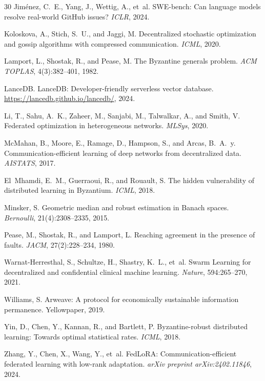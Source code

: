 \begin{thebibliography}{30}
Jim{\'e}nez, C.~E., Yang, J., Wettig, A., et~al.
\newblock SWE-bench: Can language models resolve real-world {GitHub} issues?
\newblock \emph{ICLR}, 2024.

Koloskova, A., Stich, S.~U., and Jaggi, M.
\newblock Decentralized stochastic optimization and gossip algorithms with
  compressed communication.
\newblock \emph{ICML}, 2020.

Lamport, L., Shostak, R., and Pease, M.
\newblock The Byzantine generals problem.
\newblock \emph{ACM TOPLAS}, 4(3):382--401, 1982.

LanceDB.
\newblock LanceDB: Developer-friendly serverless vector database.
\newblock \url{https://lancedb.github.io/lancedb/}, 2024.

Li, T., Sahu, A.~K., Zaheer, M., Sanjabi, M., Talwalkar, A., and Smith, V.
\newblock Federated optimization in heterogeneous networks.
\newblock \emph{MLSys}, 2020.

McMahan, B., Moore, E., Ramage, D., Hampson, S., and Arcas, B.~A.~y.
\newblock Communication-efficient learning of deep networks from decentralized
  data.
\newblock \emph{AISTATS}, 2017.

El~Mhamdi, E.~M., Guerraoui, R., and Rouault, S.
\newblock The hidden vulnerability of distributed learning in {B}yzantium.
\newblock \emph{ICML}, 2018.

Minsker, S.
\newblock Geometric median and robust estimation in {Banach} spaces.
\newblock \emph{Bernoulli}, 21(4):2308--2335, 2015.

Pease, M., Shostak, R., and Lamport, L.
\newblock Reaching agreement in the presence of faults.
\newblock \emph{JACM}, 27(2):228--234, 1980.

Warnat-Herresthal, S., Schultze, H., Shastry, K.~L., et~al.
\newblock Swarm Learning for decentralized and confidential clinical machine
  learning.
\newblock \emph{Nature}, 594:265--270, 2021.

Williams, S.
\newblock Arweave: A protocol for economically sustainable information
  permanence.
\newblock Yellowpaper, 2019.

Yin, D., Chen, Y., Kannan, R., and Bartlett, P.
\newblock Byzantine-robust distributed learning: Towards optimal statistical
  rates.
\newblock \emph{ICML}, 2018.

Zhang, Y., Chen, X., Wang, Y., et~al.
\newblock FedLoRA: Communication-efficient federated learning with low-rank
  adaptation.
\newblock \emph{arXiv preprint arXiv:2402.11846}, 2024.

\end{thebibliography}

